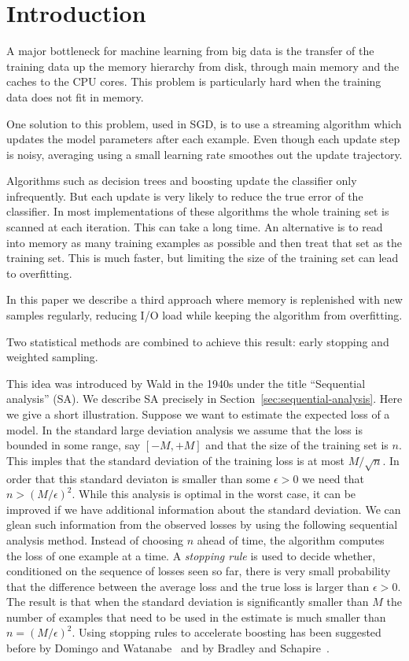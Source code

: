 \section{Introduction}\label{sec:intro}

A major bottleneck for machine learning from big data is the transfer
of the training data up the memory hierarchy from disk, through main memory
and the caches to the CPU cores. This problem is particularly hard
when the training data does not fit in memory.

One solution to this problem, used in SGD, is to use a streaming
algorithm which updates the model parameters after each
example. Even though each update step is noisy, averaging using a
small learning rate smoothes out the update trajectory.

Algorithms such as decision trees and boosting update the classifier
only infrequently. But each update is very likely to reduce the true
error of the classifier. In most implementations of these algorithms
the whole training set is scanned at each iteration. This can take a
long time. An alternative is to read into memory as many training
examples as possible and then treat that set as the training set. This
is much faster, but limiting the size of the training set can lead to
overfitting.

In this paper we describe a third approach where memory is replenished
with new samples regularly, reducing I/O load while keeping the
algorithm from overfitting.

Two statistical methods are combined to achieve this result: early
stopping and weighted sampling.

This idea was introduced by Wald\cite{wald_sequential_1973} in the
1940s under the title ``Sequential analysis'' (SA). We describe SA
precisely in Section~\ref{sec:sequential-analysis}. Here we give a
short illustration. Suppose we want to estimate the expected loss of a
model. In the standard large deviation analysis we assume that the
loss is bounded in some range, say $[-M,+M]$ and that the size of the
training set is $n$. This imples that the standard deviation of the
training loss is at most $M/\sqrt{n}$. In order that this standard
deviaton is smaller than some $\epsilon>0$ we need that $n >
(M/\epsilon)^2$. While this analysis is optimal in the worst case, it
can be improved if we have additional information about the standard
deviation. We can glean such information from the observed losses by
using the following sequential analysis method. Instead of choosing
$n$ ahead of time, the algorithm computes the loss of one example at a
time. A {\em stopping rule} is used to decide whether, conditioned on
the sequence of losses seen so far, there is very small probability
that the difference between the average loss and the true loss is
larger than $\epsilon>0$. The result is that when the standard
deviation is significantly smaller than $M$ the number of examples
that need to be used in the estimate is much smaller than
$n=(M/\epsilon)^2$.
Using stopping rules to accelerate boosting has been suggested before 
by Domingo and Watanabe~\cite{domingo_scaling_2000} and
by Bradley and Schapire~\cite{bradley_filterboost:_2007}.

